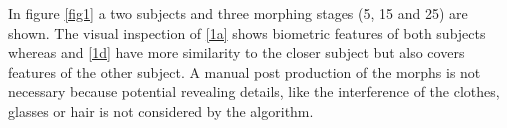 In figure \ref{fig1} a two subjects and three morphing stages (5, 15 and 25) are shown. The visual inspection of \ref{1a} shows biometric features of both subjects whereas  and \ref{1d} have more similarity to the closer subject but also covers features of the other subject.
A manual post production of the morphs is not necessary because potential revealing details, like the interference  of the clothes, glasses or hair is not considered by the algorithm.

